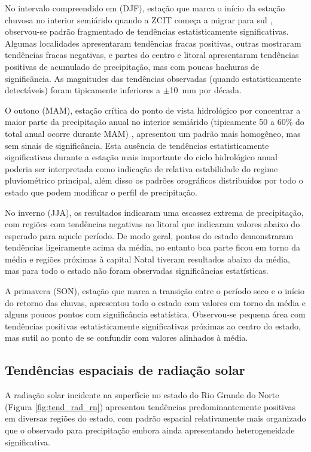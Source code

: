 No intervalo compreendido em (DJF), estação que marca o início da estação chuvosa no interior semiárido quando a ZCIT começa a migrar para sul \citep{kousky1980diurnal}, observou-se padrão fragmentado de tendências estatisticamente significativas. Algumas localidades apresentaram tendências fracas positivas, outras mostraram tendências fracas negativas, e partes do centro e litoral apresentaram tendências positivas de acumulado de precipitação, mas com poucas hachuras de significância. As magnitudes das tendências observadas (quando estatisticamente detectáveis) foram tipicamente inferiores a $\pm$10~mm por década.

O outono (MAM), estação crítica do ponto de vista hidrológico por concentrar a maior parte da precipitação anual no interior semiárido (tipicamente 50 a 60\% do total anual ocorre durante MAM) \citep{velloso2002_ecorregioes_caatinga}, apresentou um padrão mais homogêneo, mas sem sinais de significância. Esta ausência de tendências estatisticamente significativas durante a estação mais importante do ciclo hidrológico anual poderia ser interpretada como indicação de relativa estabilidade do regime pluviométrico principal, além disso os padrões orográficos distribuídos por todo o estado que podem modificar o perfil de precipitação.

No inverno (JJA), os resultados indicaram uma escassez extrema de precipitação, com regiões com tendências negativas no litoral que indicaram valores abaixo do esperado para aquele período. De modo geral, pontos do estado demonstraram tendências ligeiramente acima da média, no entanto boa parte ficou em torno da média e regiões próximas à capital Natal tiveram resultados abaixo da média, mas para todo o estado não foram observadas significâncias estatísticas.

A primavera (SON), estação que marca a transição entre o período seco e o início do retorno das chuvas, apresentou todo o estado com valores em torno da média e alguns poucos pontos com significância estatística. Observou-se pequena área com tendências positivas estatisticamente significativas próximas ao centro do estado, mas sutil ao ponto de se confundir com valores alinhados à média.

\subsection{Tendências espaciais de radiação solar}

A radiação solar incidente na superfície no estado do Rio Grande do Norte (Figura \ref{fig:tend_rad_rn}) apresentou tendências predominantemente positivas em diversas regiões do estado, com padrão espacial relativamente mais organizado que o observado para precipitação embora ainda apresentando heterogeneidade significativa.

